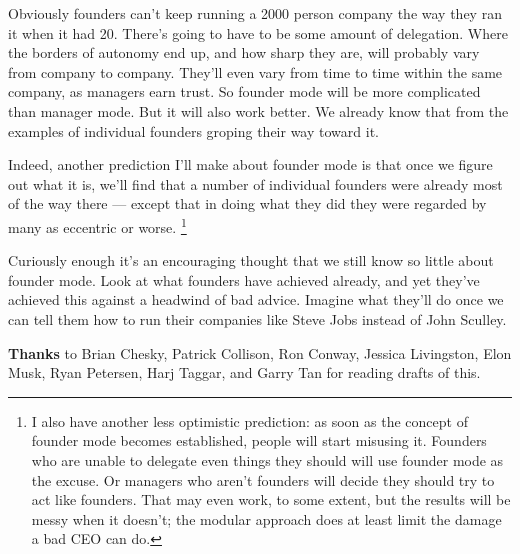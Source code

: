 Obviously founders can't keep running a 2000 person company the way they
ran it when it had 20. There's going to have to be some amount of
delegation. Where the borders of autonomy end up, and how sharp they
are, will probably vary from company to company. They'll even vary from
time to time within the same company, as managers earn trust. So founder
mode will be more complicated than manager mode. But it will also work
better. We already know that from the examples of individual founders
groping their way toward it.

Indeed, another prediction I'll make about founder mode is that once we
figure out what it is, we'll find that a number of individual founders
were already most of the way there --- except that in doing what they
did they were regarded by many as eccentric or worse.
\footnote{I also have another less optimistic prediction: as soon as the
concept of founder mode becomes established, people will start misusing
it. Founders who are unable to delegate even things they should will use
founder mode as the excuse. Or managers who aren't founders will decide
they should try to act like founders. That may even work, to some
extent, but the results will be messy when it doesn't; the modular
approach does at least limit the damage a bad CEO can do.}

Curiously enough it's an encouraging thought that we still know so
little about founder mode. Look at what founders have achieved already,
and yet they've achieved this against a headwind of bad advice. Imagine
what they'll do once we can tell them how to run their companies like
Steve Jobs instead of John Sculley.


\textbf{Thanks} to Brian Chesky, Patrick Collison, Ron Conway, Jessica
Livingston, Elon Musk, Ryan Petersen, Harj Taggar, and Garry Tan for
reading drafts of this.